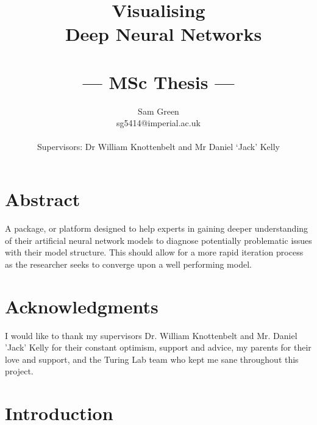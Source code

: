 \documentclass[a4paper,11pt,titlepage]{article}
\title{Visualising \\\ Deep Neural Networks \\\ \\\Large{--- MSc Thesis ---}}
\author{Sam Green\\
       \small{sg5414@imperial.ac.uk}\\ \\
       \small{Supervisors: Dr William Knottenbelt and Mr Daniel `Jack' Kelly}
}
\begin{document}
\onehalfspacing

\maketitle

\clearpage
\clearpage

\section*{Abstract}
A package, or platform designed to help experts in gaining deeper understanding of their artificial neural network models to diagnose potentially problematic issues with their model structure. This should allow for a more rapid iteration process as the researcher seeks to converge upon a well performing model.
\clearpage

\section*{Acknowledgments}
I would like to thank my supervisors Dr. William Knottenbelt and Mr. Daniel 'Jack' Kelly for their constant optimism, support and advice, my parents for their love and support, and the Turing Lab team who kept me sane throughout this project.

\clearpage

\tableofcontents

\clearpage

\section{Introduction}
\end{document}
